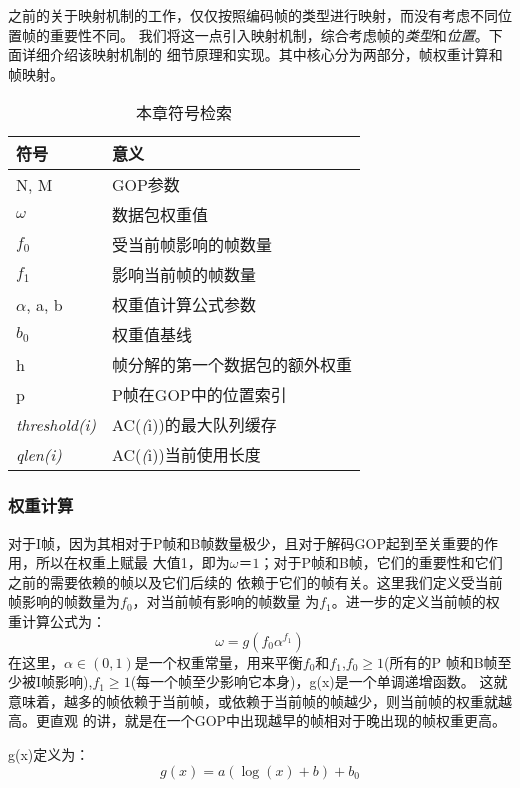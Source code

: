 之前的关于映射机制的工作，仅仅按照编码帧的类型进行映射，而没有考虑不同位置帧的重要性不同。
我们将这一点引入映射机制，综合考虑帧的\emph{类型}和\emph{位置}。下面详细介绍该映射机制的
细节原理和实现。其中核心分为两部分，帧权重计算和帧映射。

\begin{table}[htbp]
  \centering
  \caption{本章符号检索}
  \label{tab:notations}
  \begin{tabular}{p{3cm}p{8cm}}
  \hline
  符号 & 意义 \\
  \hline
  N, M &  GOP参数 \\
  $\omega$ &  数据包权重值 \\
  $f_{0}$ & 受当前帧影响的帧数量 \\
  $f_{1}$ & 影响当前帧的帧数量 \\
  $\alpha$, a, b & 权重值计算公式参数 \\
  $b_{0}$ & 权重值基线 \\
  h & 帧分解的第一个数据包的额外权重 \\
  p & P帧在GOP中的位置索引 \\
  \emph{threshold(i)} & AC(\emph(i))的最大队列缓存 \\
  \emph{qlen(i)} & AC(\emph(i))当前使用长度 \\
  \hline
  \end{tabular}
\end{table}

\renewcommand{\thesubsubsection}{\Alph{subsubsection}.}
\subsubsection{权重计算}
对于I帧，因为其相对于P帧和B帧数量极少，且对于解码GOP起到至关重要的作用，所以在权重上赋最
大值1，即为$\omega ＝1$；对于P帧和B帧，它们的重要性和它们之前的需要依赖的帧以及它们后续的
依赖于它们的帧有关。这里我们定义受当前帧影响的帧数量为$f_{0}$，对当前帧有影响的帧数量
为$f_{1}$。进一步的定义当前帧的权重计算公式为：
\begin{equation}
\omega = g(f_{0}\alpha^{f_{1}})
\end{equation}
在这里，$\alpha \in (0,1)$是一个权重常量，用来平衡$f_{0}$和$f_{1}$,$f_{0}\geq1$(所有的P
帧和B帧至少被I帧影响),$f_{1}\geq1$(每一个帧至少影响它本身)，g(x)是一个单调递增函数。
这就意味着，越多的帧依赖于当前帧，或依赖于当前帧的帧越少，则当前帧的权重就越高。更直观
的讲，就是在一个GOP中出现越早的帧相对于晚出现的帧权重更高。

g(x)定义为：
\begin{equation}
g(x) = a(\log (x) + b) + b_{0}
\end{equation}

